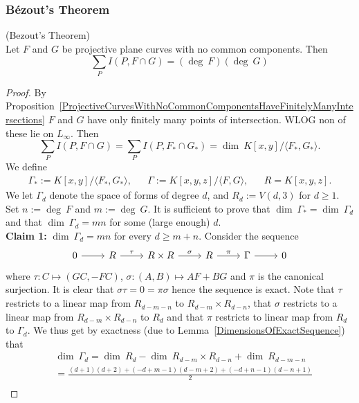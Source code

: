 \subsubsection{Bézout's Theorem}
    \begin{theorem}\label{BezoutTheorem}(Bezout's Theorem)\\
    Let $F$ and $G$ be projective plane curves with no common components. Then 
        $$
            \sum_P I(P, F\cap G) = (\deg \ F)(\deg \ G)
        $$
    \end{theorem}
    \begin{proof}
        By Proposition~\ref{ProjectiveCurvesWithNoCommonComponentsHaveFinitelyManyIntersections} $F$ and $G$ have only finitely many points of intersection. WLOG non of these lie on $L_\infty$. Then 
        $$\sum_P I(P,F\cap G) = \sum_P I(P,F_\ast\cap G_\ast) = \dim\ K[x,y]/\langle F_\ast,G_\ast\rangle.$$
        We define 
        $$
        \begin{matrix}
            \Gamma_\ast := K[x,y]/\langle F_\ast,G_\ast\rangle, && \Gamma:= K[x,y,z]/\langle F,G\rangle, && R = K[x,y,z].
        \end{matrix}
        $$
        We let $\Gamma_d$ denote the space of forms of degree $d$, and $R_d := V(d,3)$ for $d\geq 1$. Set $n:= \deg \ F$ and $m:= \deg \ G.$ It is sufficient to prove that $\dim\ \Gamma_\ast = \dim\ \Gamma_d$ and that $\dim\ \Gamma_d = mn$ for some (large enough) $d$.\\ 
        \textbf{Claim 1:} $\dim\ \Gamma_d = mn$ for every $d\geq m+n$. Consider the 
        sequence 
        $$\begin{tikzcd}
            0 \arrow[r] & R \arrow[r,"\tau"] & R\times R \arrow[r,"\sigma"] & R \arrow[r,"\pi"] & \Gamma \arrow[r] & 0
        \end{tikzcd}$$
        where $\tau: C\mapsto (GC,-FC)$, $\sigma: (A,B)\mapsto AF+BG$ and $\pi$ is the canonical surjection. It is clear that $\sigma \tau=0=\pi\sigma$ hence the sequence is exact. Note that $\tau$ restricts to a linear map from $R_{d-m-n}$ to $R_{d-m}\times R_{d-n}$, that $\sigma$ restricts to a linear map from $R_{d-m}\times R_{d-n}$ to $R_d$ and that $\pi$ restricts to linear map from $R_d$ to $\Gamma_d$. We thus get by exactness (due to Lemma~\ref{DimensionsOfExactSequence}) that 
        \begin{align*}
            &\dim\ \Gamma_d = \dim\ R_d-\dim\ R_{d-m}\times R_{d-n}+\dim\ R_{d-m-n}\\
            &=\frac{(d+1)(d+2)+(-d+m-1)(d-m+2) +(-d+n-1)(d-n+1)}{2}\\

\end{align*}
\end{proof}
